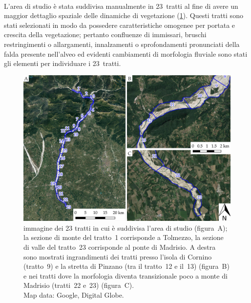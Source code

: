 %
\\
L'area di studio è stata suddivisa manualmente in 23~tratti al fine di avere un maggior dettaglio spaziale delle dinamiche di vegetazione (\cref{fig:23-tratti}). 
Questi tratti sono stati selezionati in modo da possedere caratteristiche omogenee per portata e crescita della vegetazione; 
pertanto confluenze di immissari, bruschi restringimenti o allargamenti, innalzamenti o sprofondamenti pronunciati della falda presente nell'alveo ed evidenti cambiamenti di morfologia fluviale sono stati gli elementi per individuare i 23~tratti.
%
\begin{figure}
	\centering
	\includegraphics[width=\textwidth]{files/tutti_23_tratti.jpeg}
	\caption[immagine dei 23 tratti in cui è suddivisa l'area di studio]{immagine dei 23 tratti in cui è suddivisa l'area di studio (figura~A); la sezione di monte del tratto~1 corrisponde a Tolmezzo, la sezione di valle del tratto~23 corrisponde al ponte di Madrisio. A destra sono mostrati ingrandimenti dei tratti presso l'isola di Cornino (tratto~9) e la stretta di Pinzano (tra il tratto~12 e il~13) (figura~B) e nei tratti dove la morfologia diventa transizionale poco a monte di Madrisio (tratti~22 e~23) (figura~C).
	\\
	Map data: Google, Digital Globe.}
	\label{fig:23-tratti}
\end{figure}


